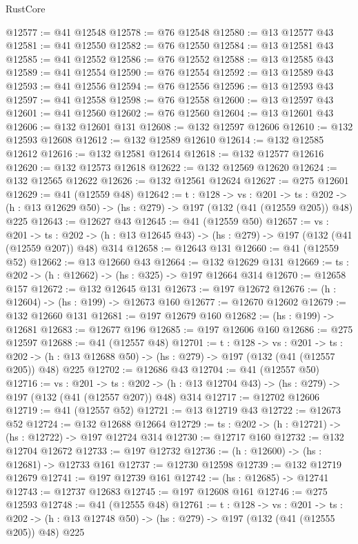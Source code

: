 \begin{lexlean}{RustCore}
\begin{coremodule}
@12577 := @41 @12548
@12578 := @76 @12548
@12580 := @13 @12577 @43
@12581 := @41 @12550
@12582 := @76 @12550
@12584 := @13 @12581 @43
@12585 := @41 @12552
@12586 := @76 @12552
@12588 := @13 @12585 @43
@12589 := @41 @12554
@12590 := @76 @12554
@12592 := @13 @12589 @43
@12593 := @41 @12556
@12594 := @76 @12556
@12596 := @13 @12593 @43
@12597 := @41 @12558
@12598 := @76 @12558
@12600 := @13 @12597 @43
@12601 := @41 @12560
@12602 := @76 @12560
@12604 := @13 @12601 @43
@12606 := @132 @12601 @131
@12608 := @132 @12597 @12606
@12610 := @132 @12593 @12608
@12612 := @132 @12589 @12610
@12614 := @132 @12585 @12612
@12616 := @132 @12581 @12614
@12618 := @132 @12577 @12616
@12620 := @132 @12573 @12618
@12622 := @132 @12569 @12620
@12624 := @132 @12565 @12622
@12626 := @132 @12561 @12624
@12627 := @275 @12601
@12629 := @41 (@12559 @48)
@12642 := {t : @128} ->
  {vs : @201} ->
  {ts : @202} -> (h : @13 @12629 @50) -> (hs : @279) -> @197 (@132 (@41 (@12559 @205)) @48) @225
@12643 := @12627 @43
@12645 := @41 (@12559 @50)
@12657 := {vs : @201} ->
  {ts : @202} -> (h : @13 @12645 @43) -> (hs : @279) -> @197 (@132 (@41 (@12559 @207)) @48) @314
@12658 := @12643 @131
@12660 := @41 (@12559 @52)
@12662 := @13 @12660 @43
@12664 := @132 @12629 @131
@12669 := {ts : @202} -> (h : @12662) -> (hs : @325) -> @197 @12664 @314
@12670 := @12658 @157
@12672 := @132 @12645 @131
@12673 := @197 @12672
@12676 := (h : @12604) -> (hs : @199) -> @12673 @160
@12677 := @12670 @12602
@12679 := @132 @12660 @131
@12681 := @197 @12679 @160
@12682 := (hs : @199) -> @12681
@12683 := @12677 @196
@12685 := @197 @12606 @160
@12686 := @275 @12597
@12688 := @41 (@12557 @48)
@12701 := {t : @128} ->
  {vs : @201} ->
  {ts : @202} -> (h : @13 @12688 @50) -> (hs : @279) -> @197 (@132 (@41 (@12557 @205)) @48) @225
@12702 := @12686 @43
@12704 := @41 (@12557 @50)
@12716 := {vs : @201} ->
  {ts : @202} -> (h : @13 @12704 @43) -> (hs : @279) -> @197 (@132 (@41 (@12557 @207)) @48) @314
@12717 := @12702 @12606
@12719 := @41 (@12557 @52)
@12721 := @13 @12719 @43
@12722 := @12673 @52
@12724 := @132 @12688 @12664
@12729 := {ts : @202} -> (h : @12721) -> (hs : @12722) -> @197 @12724 @314
@12730 := @12717 @160
@12732 := @132 @12704 @12672
@12733 := @197 @12732
@12736 := (h : @12600) -> (hs : @12681) -> @12733 @161
@12737 := @12730 @12598
@12739 := @132 @12719 @12679
@12741 := @197 @12739 @161
@12742 := (hs : @12685) -> @12741
@12743 := @12737 @12683
@12745 := @197 @12608 @161
@12746 := @275 @12593
@12748 := @41 (@12555 @48)
@12761 := {t : @128} ->
  {vs : @201} ->
  {ts : @202} -> (h : @13 @12748 @50) -> (hs : @279) -> @197 (@132 (@41 (@12555 @205)) @48) @225

\end{coremodule}
\end{lexlean}
